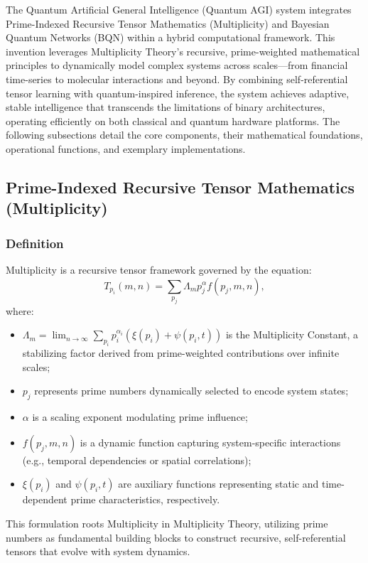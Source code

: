 \documentclass[12pt]{article}
\begin{document}
The Quantum Artificial General Intelligence (Quantum AGI) system integrates Prime-Indexed Recursive Tensor Mathematics (Multiplicity) and Bayesian Quantum Networks (BQN) within a hybrid computational framework. This invention leverages Multiplicity Theory’s recursive, prime-weighted mathematical principles to dynamically model complex systems across scales—from financial time-series to molecular interactions and beyond. By combining self-referential tensor learning with quantum-inspired inference, the system achieves adaptive, stable intelligence that transcends the limitations of binary architectures, operating efficiently on both classical and quantum hardware platforms. The following subsections detail the core components, their mathematical foundations, operational functions, and exemplary implementations.

\subsection{Prime-Indexed Recursive Tensor Mathematics (Multiplicity)}

\subsubsection{Definition}
Multiplicity is a recursive tensor framework governed by the equation:
\begin{equation}
T_{p_i}(m, n) = \sum_{p_j} \Lambda_m p_j^\alpha f(p_j, m, n),
\end{equation}
where:
\begin{itemize}
    \item \( \Lambda_m = \lim_{n \to \infty} \sum_{p_i} p_i^{\alpha_i} (\xi(p_i) + \psi(p_i, t)) \) is the Multiplicity Constant, a stabilizing factor derived from prime-weighted contributions over infinite scales;
    \item \( p_j \) represents prime numbers dynamically selected to encode system states;
    \item \( \alpha \) is a scaling exponent modulating prime influence;
    \item \( f(p_j, m, n) \) is a dynamic function capturing system-specific interactions (e.g., temporal dependencies or spatial correlations);
    \item \( \xi(p_i) \) and \( \psi(p_i, t) \) are auxiliary functions representing static and time-dependent prime characteristics, respectively.
\end{itemize}
This formulation roots Multiplicity in Multiplicity Theory, utilizing prime numbers as fundamental building blocks to construct recursive, self-referential tensors that evolve with system dynamics.
\end{document}
